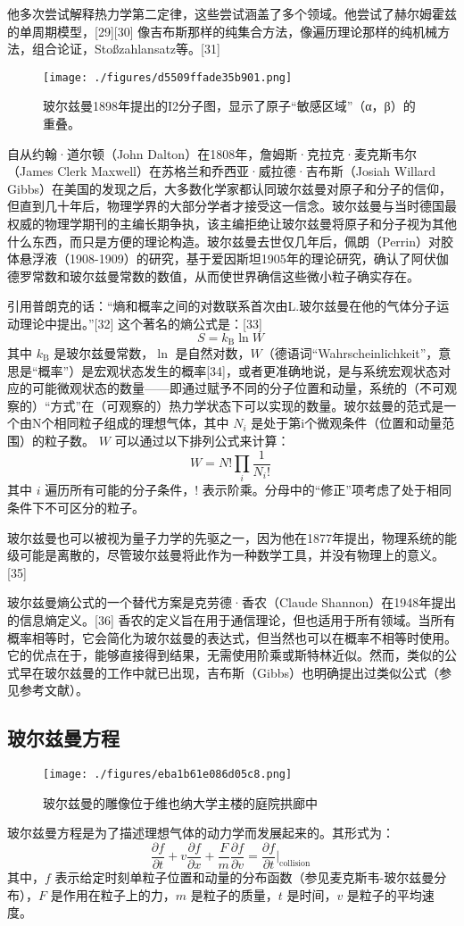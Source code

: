他多次尝试解释热力学第二定律，这些尝试涵盖了多个领域。他尝试了赫尔姆霍兹的单周期模型，[29][30] 像吉布斯那样的纯集合方法，像遍历理论那样的纯机械方法，组合论证，Stoßzahlansatz等。[31]
\begin{figure}[ht]
\centering
\texttt{[image: ./figures/d5509ffade35b901.png]}
\caption{玻尔兹曼1898年提出的I2分子图，显示了原子“敏感区域”（α，β）的重叠。} \label{fig_BRZM_3}
\end{figure}
自从约翰·道尔顿（John Dalton）在1808年，詹姆斯·克拉克·麦克斯韦尔（James Clerk Maxwell）在苏格兰和乔西亚·威拉德·吉布斯（Josiah Willard Gibbs）在美国的发现之后，大多数化学家都认同玻尔兹曼对原子和分子的信仰，但直到几十年后，物理学界的大部分学者才接受这一信念。玻尔兹曼与当时德国最权威的物理学期刊的主编长期争执，该主编拒绝让玻尔兹曼将原子和分子视为其他什么东西，而只是方便的理论构造。玻尔兹曼去世仅几年后，佩朗（Perrin）对胶体悬浮液（1908-1909）的研究，基于爱因斯坦1905年的理论研究，确认了阿伏伽德罗常数和玻尔兹曼常数的数值，从而使世界确信这些微小粒子确实存在。

引用普朗克的话：“熵和概率之间的对数联系首次由L.玻尔兹曼在他的气体分子运动理论中提出。”[32] 这个著名的熵公式是：[33]
\[
S = k_{\mathrm{B}} \ln W~
\]
其中 \( k_{\mathrm{B}} \) 是玻尔兹曼常数，\( \ln \) 是自然对数，\( W \)（德语词“Wahrscheinlichkeit”，意思是“概率”）是宏观状态发生的概率[34]，或者更准确地说，是与系统宏观状态对应的可能微观状态的数量——即通过赋予不同的分子位置和动量，系统的（不可观察的）“方式”在（可观察的）热力学状态下可以实现的数量。玻尔兹曼的范式是一个由N个相同粒子组成的理想气体，其中 \( N_i \) 是处于第i个微观条件（位置和动量范围）的粒子数。 \( W \) 可以通过以下排列公式来计算：
\[
W = N! \prod_{i} \frac{1}{N_i!}~
\]
其中 \( i \) 遍历所有可能的分子条件，\( ! \) 表示阶乘。分母中的“修正”项考虑了处于相同条件下不可区分的粒子。

玻尔兹曼也可以被视为量子力学的先驱之一，因为他在1877年提出，物理系统的能级可能是离散的，尽管玻尔兹曼将此作为一种数学工具，并没有物理上的意义。[35]

玻尔兹曼熵公式的一个替代方案是克劳德·香农（Claude Shannon）在1948年提出的信息熵定义。[36] 香农的定义旨在用于通信理论，但也适用于所有领域。当所有概率相等时，它会简化为玻尔兹曼的表达式，但当然也可以在概率不相等时使用。它的优点在于，能够直接得到结果，无需使用阶乘或斯特林近似。然而，类似的公式早在玻尔兹曼的工作中就已出现，吉布斯（Gibbs）也明确提出过类似公式（参见参考文献）。
\subsection{玻尔兹曼方程} 
\begin{figure}[ht]
\centering
\texttt{[image: ./figures/eba1b61e086d05c8.png]}
\caption{玻尔兹曼的雕像位于维也纳大学主楼的庭院拱廊中} \label{fig_BRZM_4}
\end{figure}
玻尔兹曼方程是为了描述理想气体的动力学而发展起来的。其形式为：
\[
\frac{\partial f}{\partial t} + v \frac{\partial f}{\partial x} + \frac{F}{m} \frac{\partial f}{\partial v} = \frac{\partial f}{\partial t}\Big|_{\text{collision}}~
\]
其中，\( f \) 表示给定时刻单粒子位置和动量的分布函数（参见麦克斯韦-玻尔兹曼分布），\( F \) 是作用在粒子上的力，\( m \) 是粒子的质量，\( t \) 是时间，\( v \) 是粒子的平均速度。

